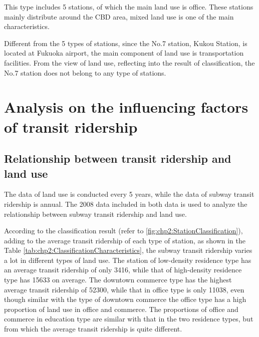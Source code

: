 %
This type includes 5 stations, of which the main land use is office. These stations mainly distribute around the CBD area, mixed land use is one of the main characteristics.

%
Different from the 5 types of stations, since the No.7 station, Kukou Station, is located at Fukuoka airport, the main component of land use is transportation facilities. From the view of land use, reflecting into the result of classification, the No.7 station does not belong to any type of stations.


%
\section{Analysis on the influencing factors of transit ridership}
\subsection{Relationship between transit ridership and land use}
%
The data of land use is conducted every 5 years, while the data of subway transit ridership is annual. The 2008 data included in both data is used to analyze the relationship between subway transit ridership and land use.

%
According to the classification result (refer to \ref{fig:chp2:StationClassification}), adding to the average transit ridership of each type of station, as shown in the Table \ref{tab:chp2:ClassificationCharacteristics}, the subway transit ridership varies a lot in different types of land use. The station of low-density residence type has an average transit ridership of only 3416, while that of high-density residence type has 15633 on average. The downtown commerce type has the highest average transit ridership of 52300, while that in office type is only 11038, even though similar with the type of downtown commerce the office type has a high proportion of land use in office and commerce. The proportions of office and commerce in education type are similar with that in the two residence types, but from which the average transit ridership is quite different.

